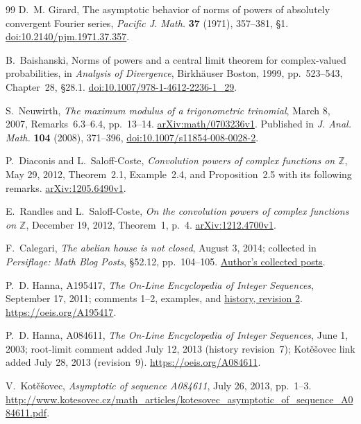 \documentclass[11pt]{article}
\begin{document}
\begin{thebibliography}{99}
D.~M. Girard, The asymptotic behavior of norms of powers of absolutely
convergent Fourier series, \emph{Pacific J. Math.} \textbf{37} (1971),
357--381, \S1.
\href{https://doi.org/10.2140/pjm.1971.37.357}{doi:10.2140/pjm.1971.37.357}.

B.~Baishanski, Norms of powers and a central limit theorem for
complex-valued probabilities, in \emph{Analysis of Divergence},
Birkh\"auser Boston, 1999, pp.~523--543, Chapter~28, \S28.1.
\href{https://doi.org/10.1007/978-1-4612-2236-1_29}{doi:10.1007/978-1-4612-2236-1\_29}.

S.~Neuwirth, \emph{The maximum modulus of a trigonometric trinomial},
March 8, 2007, Remarks~6.3--6.4, pp.~13--14.
\href{https://arxiv.org/abs/math/0703236v1}{arXiv:math/0703236v1}.
Published in \emph{J. Anal. Math.} \textbf{104} (2008), 371--396,
\href{https://doi.org/10.1007/s11854-008-0028-2}{doi:10.1007/s11854-008-0028-2}.

P.~Diaconis and L.~Saloff-Coste, \emph{Convolution powers of complex
functions on $\mathbb Z$}, May 29, 2012, Theorem~2.1, Example~2.4,
and Proposition~2.5 with its following remarks.
\href{https://arxiv.org/abs/1205.6490v1}{arXiv:1205.6490v1}.

E.~Randles and L.~Saloff-Coste, \emph{On the convolution powers of
complex functions on $\mathbb Z$}, December 19, 2012, Theorem~1, p.~4.
\href{https://arxiv.org/abs/1212.4700v1}{arXiv:1212.4700v1}.

F.~Calegari, \emph{The abelian house is not closed}, August 3, 2014;
collected in \emph{Persiflage: Math Blog Posts}, \S52.12, pp.~104--105.
\href{https://math.uchicago.edu/~fcale/papers/blog.pdf}{Author's collected posts}.

P.~D. Hanna, A195417, \emph{The On-Line Encyclopedia of Integer Sequences},
September 17, 2011; comments 1--2, examples, and
\href{https://oeis.org/history?seq=A195417}{history, revision 2}.
\url{https://oeis.org/A195417}.

P.~D. Hanna, A084611, \emph{The On-Line Encyclopedia of Integer Sequences},
June 1, 2003; root-limit comment added July 12, 2013
(history revision~7); Kot\v{e}\v{s}ovec link added July 28, 2013
(revision~9).
\url{https://oeis.org/A084611}.

V.~Kot\v{e}\v{s}ovec, \emph{Asymptotic of sequence A084611},
July 26, 2013, pp.~1--3.
\url{http://www.kotesovec.cz/math_articles/kotesovec_asymptotic_of_sequence_A084611.pdf}.


\end{thebibliography}
\end{document}
